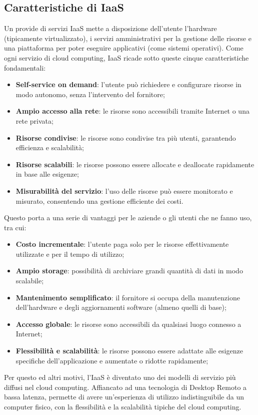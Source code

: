 \documentclass[12pt,a4paper,openright,twoside]{book}
\begin{document}
\subsection{Caratteristiche di IaaS}
Un provide di servizi IaaS mette a disposizione dell'utente l'hardware (tipicamente virtualizzato), i servizi amministrativi per la gestione delle risorse e una piattaforma per poter eseguire applicativi (come sistemi operativi).
Come ogni servizio di cloud computing, IaaS ricade sotto queste cinque caratteristiche fondamentali:
\begin{itemize}
    \item \textbf{Self-service on demand}: l'utente può richiedere e configurare risorse in modo autonomo, senza l'intervento del fornitore;
    \item \textbf{Ampio accesso alla rete}: le risorse sono accessibili tramite Internet o una rete privata;
    \item \textbf{Risorse condivise}: le risorse sono condivise tra più utenti, garantendo efficienza e scalabilità;
    \item \textbf{Risorse scalabili}: le risorse possono essere allocate e deallocate rapidamente in base alle esigenze;
    \item \textbf{Misurabilità del servizio}: l'uso delle risorse può essere monitorato e misurato, consentendo una gestione efficiente dei costi.
\end{itemize}
Questo porta a una serie di vantaggi per le aziende o gli utenti che ne fanno uso, tra cui:
\begin{itemize}
    \item \textbf{Costo incrementale}: l'utente paga solo per le risorse effettivamente utilizzate e per il tempo di utilizzo;
    \item \textbf{Ampio storage}: possibilità di archiviare grandi quantità di dati in modo scalabile;
    \item \textbf{Mantenimento semplificato}: il fornitore si occupa della manutenzione dell'hardware e degli aggiornamenti software (almeno quelli di base);
    \item \textbf{Accesso globale}: le risorse sono accessibili da qualsiasi luogo connesso a Internet;
    \item \textbf{Flessibilità e scalabilità}: le risorse possono essere adattate alle esigenze specifiche dell'applicazione e aumentate o ridotte rapidamente;
\end{itemize}   
Per questo ed altri motivi, l'IaaS è diventato uno dei modelli di servizio più diffusi nel cloud computing. Affiancato ad una tecnologia di Desktop Remoto a bassa latenza, permette di avere un'esperienza di utilizzo indistinguibile da un computer fisico, con la flessibilità e la scalabilità tipiche del cloud computing.
\end{document}
